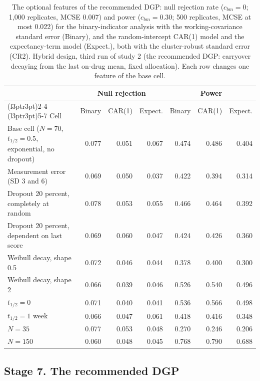\documentclass[
  11pt,
]{article}
\begin{document}
\begin{table}
\centering
\caption{\label{tab:options}The optional features of the recommended DGP: null rejection rate ($c_{bm} = 0$; 1,000 replicates, MCSE 0.007) and power ($c_{bm} = 0.30$; 500 replicates, MCSE at most 0.022) for the binary-indicator analysis with the working-covariance standard error (Binary), and the random-intercept CAR(1) model and the expectancy-term model (Expect.), both with the cluster-robust standard error (CR2). Hybrid design, third run of study 2 (the recommended DGP: carryover decaying from the last on-drug mean, fixed allocation). Each row changes one feature of the base cell.}
\centering
\fontsize{9}{11}\selectfont
\begin{tabular}[t]{>{\raggedright\arraybackslash}p{4.5cm}rrrrrr}
\toprule
\multicolumn{1}{c}{ } & \multicolumn{3}{c}{Null rejection} & \multicolumn{3}{c}{Power} \\
\cmidrule(l{3pt}r{3pt}){2-4} \cmidrule(l{3pt}r{3pt}){5-7}
Cell & Binary & CAR(1) & Expect. & Binary & CAR(1) & Expect.\\
\midrule
Base cell ($N = 70$, $t_{1/2} = 0.5$, exponential, no dropout) & 0.077 & 0.051 & 0.067 & 0.474 & 0.486 & 0.404\\
Measurement error (SD 3 and 6) & 0.069 & 0.050 & 0.037 & 0.422 & 0.394 & 0.314\\
Dropout 20 percent, completely at random & 0.078 & 0.053 & 0.055 & 0.466 & 0.464 & 0.392\\
Dropout 20 percent, dependent on last score & 0.069 & 0.060 & 0.047 & 0.424 & 0.426 & 0.360\\
Weibull decay, shape 0.5 & 0.072 & 0.046 & 0.044 & 0.378 & 0.400 & 0.300\\
Weibull decay, shape 2 & 0.066 & 0.039 & 0.046 & 0.526 & 0.540 & 0.496\\
$t_{1/2} = 0$ & 0.071 & 0.040 & 0.041 & 0.536 & 0.566 & 0.498\\
$t_{1/2} = 1$ week & 0.066 & 0.047 & 0.061 & 0.418 & 0.416 & 0.348\\
$N = 35$ & 0.077 & 0.053 & 0.048 & 0.270 & 0.246 & 0.206\\
$N = 150$ & 0.060 & 0.048 & 0.045 & 0.768 & 0.790 & 0.688\\
\bottomrule
\end{tabular}
\end{table}

\subsection{Stage 7. The recommended DGP}\label{stage-7.-the-recommended-dgp}
\end{document}

